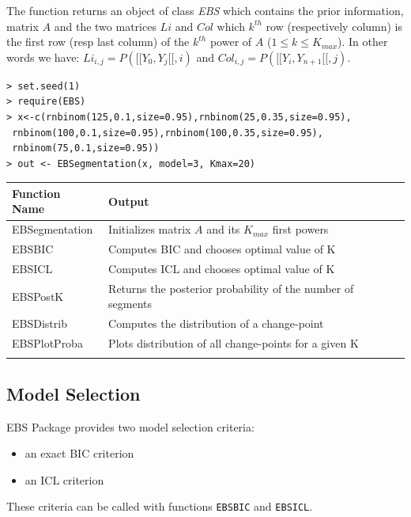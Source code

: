 \documentclass{bioinfo}
\begin{document}
\begin{methods}
The function returns an object of class \textit{EBS} which contains the prior information, matrix $A$ and the two matrices $Li$ and $Col$
 which $k^{th}$ row (respectively column) is the first row (resp last column) of the $k^{th}$ power of $A$ ($1\leq k \leq K_{max}$). 
In other words we have: $Li_{i,j}=P([\![Y_0,Y_j[\![,i)$ and $Col_{i,j}=P([\![Y_i,Y_{n+1}[\![,j)$.

\begin{verbatim}
> set.seed(1)
> require(EBS)
> x<-c(rnbinom(125,0.1,size=0.95),rnbinom(25,0.35,size=0.95),
 rnbinom(100,0.1,size=0.95),rnbinom(100,0.35,size=0.95),
 rnbinom(75,0.1,size=0.95))
> out <- EBSegmentation(x, model=3, Kmax=20)
\end{verbatim}


\begin{table}[!t]
{\begin{tabular}{ll}\toprule
Function Name & Output \\\midrule
 EBSegmentation & Initializes matrix $A$ and its $K_{max}$ first powers\\
 EBSBIC & Computes BIC and chooses optimal value of K \\
 EBSICL & Computes ICL and chooses optimal value of K \\
 EBSPostK & Returns the posterior probability of the number of segments\\
 EBSDistrib & Computes the distribution of a change-point\\
 EBSPlotProba & Plots distribution of all change-points for a given K\\\botrule
\end{tabular}}{}
\end{table}




\subsection{Model Selection}

EBS Package provides two model selection criteria:
\begin{itemize}
\item an exact BIC criterion
\item an ICL criterion
\end{itemize}


These criteria can be called with functions \texttt{EBSBIC} and \texttt{EBSICL}. 


\end{methods}
\end{document}
